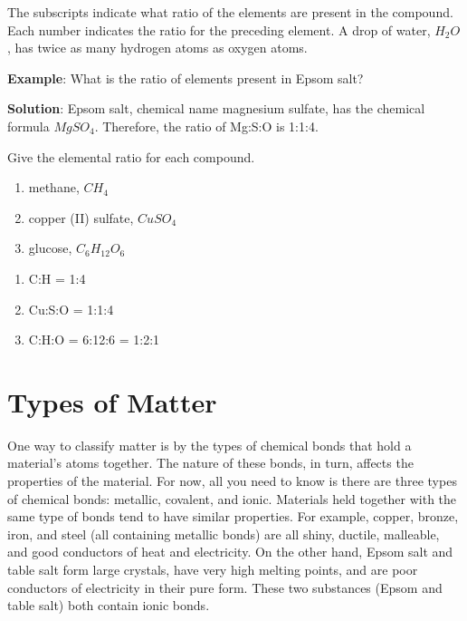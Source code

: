 The subscripts indicate what ratio of the elements are present in the compound. 
Each number indicates the ratio for the preceding element. A drop of water, 
$H_2O$, has twice as many hydrogen atoms as oxygen atoms. 

\textbf{Example}: What is the ratio of elements present in Epsom salt?

\textbf{Solution}: Epsom salt, chemical name magnesium sulfate, has the chemical formula $MgSO_4$. Therefore, the ratio of Mg:S:O is 1:1:4. 

\begin{Exercise}[title = {Numbers of Atoms in Molecules}, label = num_atom]
Give the elemental ratio for each compound. 
\begin{enumerate}
\item methane, $CH_4$
\item copper (II) sulfate, $CuSO_4$
\item glucose, $C_6H_{12}O_6$
\end{enumerate}
\end{Exercise}

\begin{Answer}[ref = num_atom]
\begin{enumerate}
\item C:H = 1:4
\item Cu:S:O = 1:1:4
\item C:H:O = 6:12:6 = 1:2:1
\end{enumerate}
\end{Answer}

\section{Types of Matter}
One way to classify matter is by the types of chemical bonds that hold a 
material's atoms together. The nature of these bonds, in turn, affects the 
properties of the material. For now, all you need to know is there are three types
of chemical bonds: metallic, covalent, and ionic. Materials held together with the
same type of bonds tend to have similar properties. For example, copper, bronze, 
iron, and steel (all containing metallic bonds) are all shiny, ductile, malleable,
and good conductors of heat and electricity. On the other hand, Epsom salt and 
table salt form large crystals, have very high melting points, and are poor 
conductors of electricity in their pure form. These two substances (Epsom and 
table salt) both contain ionic bonds. 

